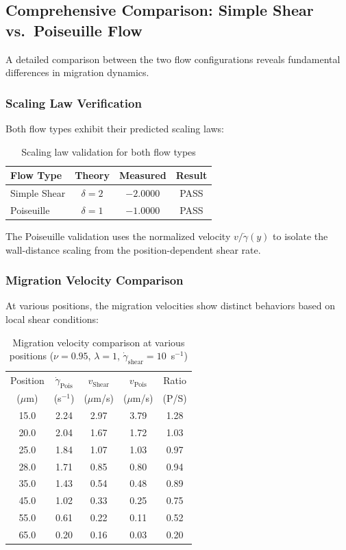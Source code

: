 \documentclass{article}
\begin{document}
\subsection{Comprehensive Comparison: Simple Shear vs.\ Poiseuille Flow}

A detailed comparison between the two flow configurations reveals fundamental differences in migration dynamics.

\subsubsection{Scaling Law Verification}

Both flow types exhibit their predicted scaling laws:

\begin{table}[H]
\centering
\caption{Scaling law validation for both flow types}
\label{tab:scaling_both}
\begin{tabular}{lccc}
\toprule
\textbf{Flow Type} & \textbf{Theory} & \textbf{Measured} & \textbf{Result} \\
\midrule
Simple Shear & $\delta = 2$ & $-2.0000$ & PASS \\
Poiseuille & $\delta = 1$ & $-1.0000$ & PASS \\
\bottomrule
\end{tabular}
\end{table}

The Poiseuille validation uses the normalized velocity $v/\dot{\gamma}(y)$ to isolate the wall-distance scaling from the position-dependent shear rate.

\subsubsection{Migration Velocity Comparison}

At various positions, the migration velocities show distinct behaviors based on local shear conditions:

\begin{table}[H]
\centering
\caption{Migration velocity comparison at various positions ($\nu = 0.95$, $\lambda = 1$, $\dot{\gamma}_{\text{shear}} = 10$~s$^{-1}$)}
\label{tab:velocity_comparison}
\begin{tabular}{ccccc}
\toprule
Position & $\dot{\gamma}_{\text{Pois}}$ & $v_{\text{Shear}}$ & $v_{\text{Pois}}$ & Ratio \\
($\mu$m) & (s$^{-1}$) & ($\mu$m/s) & ($\mu$m/s) & (P/S) \\
\midrule
15.0 & 2.24 & 2.97 & 3.79 & 1.28 \\
20.0 & 2.04 & 1.67 & 1.72 & 1.03 \\
25.0 & 1.84 & 1.07 & 1.03 & 0.97 \\
28.0 & 1.71 & 0.85 & 0.80 & 0.94 \\
35.0 & 1.43 & 0.54 & 0.48 & 0.89 \\
45.0 & 1.02 & 0.33 & 0.25 & 0.75 \\
55.0 & 0.61 & 0.22 & 0.11 & 0.52 \\
65.0 & 0.20 & 0.16 & 0.03 & 0.20 \\
\bottomrule
\end{tabular}
\end{table}
\end{document}
